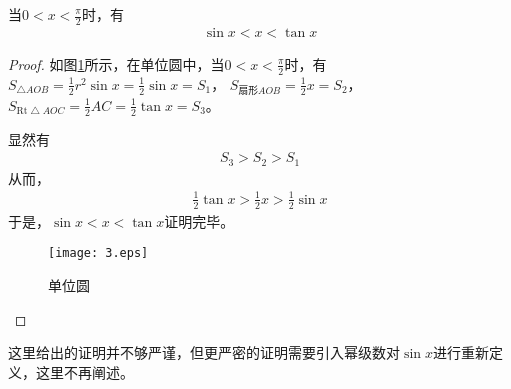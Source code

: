     当$ 0<x<\displaystyle\frac{\pi}{2} $时，有
    \begin{align*}
        \sin x<x<\tan x
    \end{align*}
        \begin{proof}
        如图\ref{dwy}所示，在单位圆中，当$ 0<x<\displaystyle\frac{\pi}{2}$时，有
        $S_{\bigtriangleup AOB}=\displaystyle\frac{1}{2}r^2 \sin x=\displaystyle\frac{1}{2}\sin x=S_1$， 
        $S_{\text{扇形} AOB}=\displaystyle\frac{1}{2}x=S_2$， 
        $S_{\mathrm{Rt} \bigtriangleup AOC}=\displaystyle\frac{1}{2}AC=\displaystyle\frac{1}{2}\tan x=S_3$。
        
        显然有
        \begin{align*}
            S_3>S_2>S_1
        \end{align*}
        从而，
        \begin{align*}
            \frac{1}{2}\tan x>\frac{1}{2}x>\frac{1}{2}\sin x
        \end{align*}
        于是，$\sin x<x<\tan x$证明完毕。
        \begin{figure}[htbp]
            \centering
            \texttt{[image: 3.eps]}
            \caption{单位圆}
            \label{dwy}
          \end{figure}
        \end{proof}
        \begin{note}
            这里给出的证明并不够严谨，但更严密的证明需要引入幂级数对$\sin x$进行重新定义，这里不再阐述。
        \end{note}
        



   